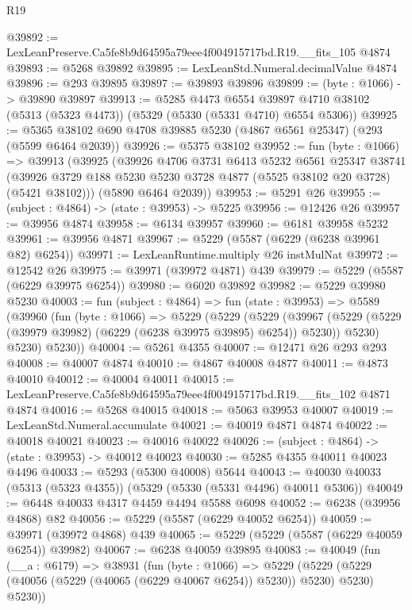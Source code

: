 \begin{lexlean}{R19}
\begin{coremodule}
@39892 := LexLeanPreserve.Ca5fe8b9d64595a79eee4f004915717bd.R19.__fits_105 @4874
@39893 := @5268 @39892
@39895 := LexLeanStd.Numeral.decimalValue @4874
@39896 := @293 @39895
@39897 := @39893 @39896
@39899 := (byte : @1066) -> @39890 @39897
@39913 := @5285
    @4473
    @6554
    @39897
    @4710
    @38102
    (@5313 (@5323 @4473))
    (@5329 (@5330 (@5331 @4710) @6554 @5306))
@39925 := @5365 @38102 @690 @4708 @39885 @5230 (@4867 @6561 @25347) (@293 (@5599 @6464 @2039))
@39926 := @5375 @38102
@39952 := fun (byte : @1066) =>
  @39913
    (@39925
      (@39926
        @4706
        @3731
        @6413
        @5232
        @6561
        @25347
        @38741
        (@39926 @3729 @188 @5230 @5230 @3728 @4877 (@5525 @38102 @20 @3728) (@5421 @38102)))
      (@5890 @6464 @2039))
@39953 := @5291 @26
@39955 := (subject : @4864) -> (state : @39953) -> @5225
@39956 := @12426 @26
@39957 := @39956 @4874
@39958 := @6134 @39957
@39960 := @6181 @39958 @5232
@39961 := @39956 @4871
@39967 := @5229 (@5587 (@6229 (@6238 @39961 @82) @6254))
@39971 := LexLeanRuntime.multiply @26 instMulNat
@39972 := @12542 @26
@39975 := @39971 (@39972 @4871) @439
@39979 := @5229 (@5587 (@6229 @39975 @6254))
@39980 := @6020 @39892
@39982 := @5229 @39980 @5230
@40003 := fun (subject : @4864) =>
  fun (state : @39953) =>
  @5589
    (@39960
      (fun (byte : @1066) =>
      @5229
        (@5229
          (@5229
            (@39967 (@5229 (@5229 (@39979 @39982) (@6229 (@6238 @39975 @39895) @6254)) @5230))
            @5230)
          @5230)
        @5230))
@40004 := @5261 @4355
@40007 := @12471 @26 @293 @293
@40008 := @40007 @4874
@40010 := @4867 @40008 @4877
@40011 := @4873 @40010
@40012 := @40004 @40011
@40015 := LexLeanPreserve.Ca5fe8b9d64595a79eee4f004915717bd.R19.__fits_102 @4871 @4874
@40016 := @5268 @40015
@40018 := @5063 @39953 @40007
@40019 := LexLeanStd.Numeral.accumulate
@40021 := @40019 @4871 @4874
@40022 := @40018 @40021
@40023 := @40016 @40022
@40026 := (subject : @4864) -> (state : @39953) -> @40012 @40023
@40030 := @5285 @4355 @40011 @40023 @4496
@40033 := @5293 (@5300 @40008) @5644
@40043 := @40030 @40033 (@5313 (@5323 @4355)) (@5329 (@5330 (@5331 @4496) @40011 @5306))
@40049 := @6448 @40033 @4317 @4459 @4494 @5588 @6098
@40052 := @6238 (@39956 @4868) @82
@40056 := @5229 (@5587 (@6229 @40052 @6254))
@40059 := @39971 (@39972 @4868) @439
@40065 := @5229 (@5229 (@5587 (@6229 @40059 @6254)) @39982)
@40067 := @6238 @40059 @39895
@40083 := @40049
    (fun (__a : @6179) =>
    @38931
      (fun (byte : @1066) =>
      @5229 (@5229 (@5229 (@40056 (@5229 (@40065 (@6229 @40067 @6254)) @5230)) @5230) @5230) @5230))

\end{coremodule}
\end{lexlean}
